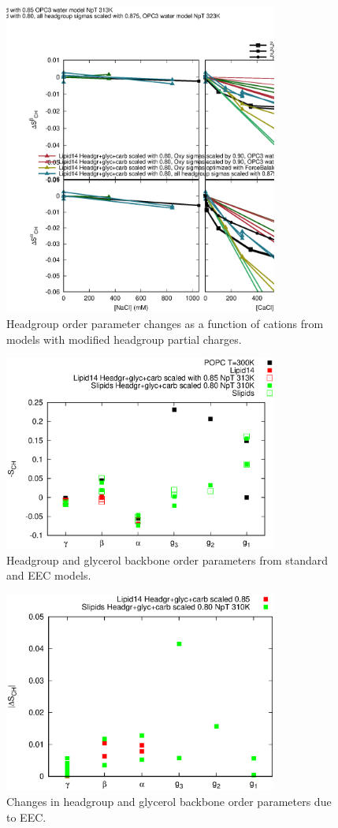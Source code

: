 \documentclass[aip,jcp]{revtex4}
\begin{document}
\begin{figure}[]
  \centering
  \includegraphics[width=9.0cm]{../Fig/OrderParameterCHANGESnewMODELS.eps}
  \caption{\label{OrderParameterCHANGESnewMODELS}
    Headgroup order parameter changes as a function of cations from models
    with modified headgroup partial charges.}
\end{figure}



\begin{figure}[]
  \centering
  \includegraphics[width=9.0cm]{../Fig/HGopsNEWmodels.eps}
  \caption{\label{HGopsNEWmodels}
    Headgroup and glycerol backbone order parameters from standard and EEC models.}
\end{figure}

\begin{figure}[]
  \centering
  \includegraphics[width=9.0cm]{../Fig/HGopsNEWmodelsCHANGE.eps}
  \caption{\label{HGopsNEWmodelsCHANGE}
    Changes in headgroup and glycerol backbone order parameters due to EEC.}
\end{figure}
\end{document}

